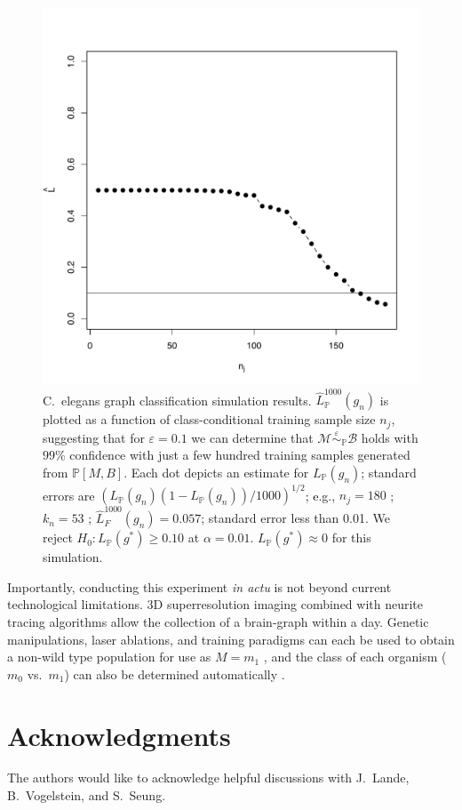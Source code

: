 \documentclass{article}
\newcommand{\mB}{\mathcal{B}}
\newcommand{\mM}{\mathcal{M}}
\newcommand{\PP}{\mathbb{P}}           %
\newcommand{\hL}{\widehat{L}}
\newcommand{\MeB}{\mM \overset{\varepsilon}{{\sim}}_{\PP} \mB}
\providecommand{\tr}[1]{\textcolor{black}{#1}}
\begin{document}
\begin{figure}[!ht]
\centering \includegraphics[width=.5\linewidth]{Lhatplot}
\caption{C.~elegans graph classification simulation results. $\hL^{1000}_{\PP}(g_n)$ is plotted as a function of class-conditional training sample size $n_j$, suggesting that for $\varepsilon=0.1$ we can determine that $\MeB$ holds with $99\%$ confidence with just a few hundred training samples generated from $\PP[M,B]$. Each dot depicts an estimate for $L_{\PP}(g_n)$; standard errors are $(L_{\PP}(g_n)(1-L_{\PP}(g_n))/1000)^{1/2}$\tr{; e}.g., $n_j = 180$ ; $k_n = 53$ ; $\hL^{1000}_{F}(g_n) = 0.057$; standard error less than 0.01. We reject $H_0: L_{\PP}(g^*) \geq 0.10$ at $\alpha=0.01$. $L_{\PP}(g^*) \approx 0$ for this simulation.
}
\label{fig1}
\end{figure}

Importantly, conducting this experiment {\it in actu} is not beyond current technological limitations. 3D superresolution imaging \cite{VaziriShank08} combined with neurite tracing algorithms \cite{HelmstaedterDenk08,Mishchenko09,LuLichtman09} allow the collection of a brain-graph within a day. Genetic manipulations, laser ablations, and training paradigms can each be used to obtain a non-wild type population for use as $M=m_1$ \cite{deBonoMaricq05}, and the class of each organism ($m_0$ vs.~$m_1$) can also be determined automatically \cite{BuckinghamSattelle08}.

\clearpage




\section*{Acknowledgments}

The authors would like to acknowledge helpful discussions with J.~Lande, B.~Vogelstein, and S.~Seung. 


% 


\end{document}
